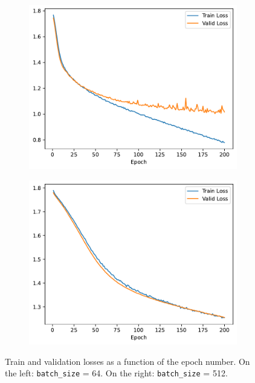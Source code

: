 \documentclass[a4paper, 12pt]{article}
\begin{document}
\begin{figure}[H]
    \centering
     \begin{subfigure}{0.47\textwidth}
        \includegraphics[width=\textwidth]{plot/mlp-training-loss-batch-64-lr-0.002-epochs-200-hidden-200-dropout-0.3-l2-0.0-layers-2-act-relu-opt-sgd-mom-0.0.pdf}
        \label{fig:3_ii}
    \end{subfigure}
    \hfill
    \begin{subfigure}{0.47
    \textwidth}
        \includegraphics[width=\textwidth]{plot/mlp-training-loss-batch-512-lr-0.002-epochs-200-hidden-200-dropout-0.3-l2-0.0-layers-2-act-relu-opt-sgd-mom-0.0.pdf}
        \label{fig:3_ieg}
    \end{subfigure}
    \vspace{-0.6cm}
    \caption{Train and validation losses as a function of the epoch number. On the left: \texttt{batch\_size} = 64. On the right: \texttt{batch\_size} = 512. }
    \label{fig:q3}
\end{figure}
\end{document}
